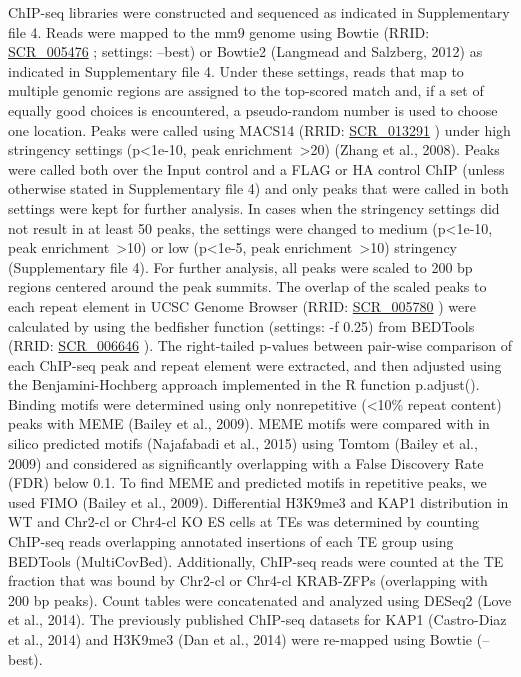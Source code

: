 \documentclass[11pt,a4paper]{article}
\begin{document}
ChIP-seq libraries were constructed and sequenced as indicated in Supplementary file 4. Reads were mapped to the mm9 genome using Bowtie (RRID: \href{https://scicrunch.org/resolver/SCR\_005476}{SCR\_005476} ; settings: --best) or Bowtie2 (Langmead and Salzberg, 2012) as indicated in Supplementary file 4. Under these settings, reads that map to multiple genomic regions are assigned to the top-scored match and, if a set of equally good choices is encountered, a pseudo-random number is used to choose one location. Peaks were called using MACS14 (RRID: \href{https://scicrunch.org/resolver/SCR\_013291}{SCR\_013291} ) under high stringency settings (p<1e-10, peak enrichment >20) (Zhang et al., 2008). Peaks were called both over the Input control and a FLAG or HA control ChIP (unless otherwise stated in Supplementary file 4) and only peaks that were called in both settings were kept for further analysis. In cases when the stringency settings did not result in at least 50 peaks, the settings were changed to medium (p<1e-10, peak enrichment >10) or low (p<1e-5, peak enrichment >10) stringency (Supplementary file 4). For further analysis, all peaks were scaled to 200 bp regions centered around the peak summits. The overlap of the scaled peaks to each repeat element in UCSC Genome Browser (RRID: \href{https://scicrunch.org/resolver/SCR\_005780}{SCR\_005780} ) were calculated by using the bedfisher function (settings: -f 0.25) from BEDTools (RRID: \href{https://scicrunch.org/resolver/SCR\_006646}{SCR\_006646} ). The right-tailed p-values between pair-wise comparison of each ChIP-seq peak and repeat element were extracted, and then adjusted using the Benjamini-Hochberg approach implemented in the R function p.adjust(). Binding motifs were determined using only nonrepetitive (<10\% repeat content) peaks with MEME (Bailey et al., 2009). MEME motifs were compared with in silico predicted motifs (Najafabadi et al., 2015) using Tomtom (Bailey et al., 2009) and considered as significantly overlapping with a False Discovery Rate (FDR) below 0.1. To find MEME and predicted motifs in repetitive peaks, we used FIMO (Bailey et al., 2009). Differential H3K9me3 and KAP1 distribution in WT and Chr2-cl or Chr4-cl KO ES cells at TEs was determined by counting ChIP-seq reads overlapping annotated insertions of each TE group using BEDTools (MultiCovBed). Additionally, ChIP-seq reads were counted at the TE fraction that was bound by Chr2-cl or Chr4-cl KRAB-ZFPs (overlapping with 200 bp peaks). Count tables were concatenated and analyzed using DESeq2 (Love et al., 2014). The previously published ChIP-seq datasets for KAP1 (Castro-Diaz et al., 2014) and H3K9me3 (Dan et al., 2014) were re-mapped using Bowtie (--best).
\end{document}
